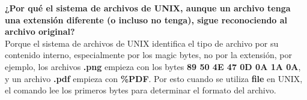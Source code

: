 \textbf{¿Por qué el sistema de archivos de UNIX, aunque un archivo tenga una extensión diferente (o incluso no tenga), sigue reconociendo al archivo original?}\\

Porque el sistema de archivos de UNIX identifica el tipo de archivo por su contenido interno, especialmente por los magic bytes, no por la extensión, por ejemplo, los archivos \textbf{.png} empieza con los bytes \textbf{89 50 4E 47 0D 0A 1A 0A}, y un archivo \textbf{.pdf} empieza con \textbf{\%PDF}. Por esto cuando se utiliza \textbf{file} en UNIX, el comando lee los primeros bytes para determinar el formato del archivo.